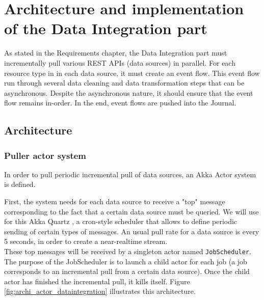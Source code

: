 \chapter{Architecture and implementation of the Data Integration part}

As stated in the Requirements chapter, the Data Integration part must incrementally pull various REST APIs (data sources) in parallel. For each resource type in
in each data source, it must create an event flow. This event flow run through several data cleaning and data transformation steps that can
be asynchronous. Despite the asynchronous nature, it should ensure that the event flow remains in-order. In the end, event flows are pushed
into the Journal.

\section{Architecture}

\subsection{Puller actor system}

In order to pull periodic incremental pull of data sources, an Akka Actor system is defined. 

First, the system needs for each data source to receive a "top" message corresponding to the fact that a certain data source must be queried. We will use for this
Akka Quartz , a cron-style scheduler that allows to define periodic sending of certain types of messages. An usual pull rate for a data source
is every 5 seconds, in order to create a near-realtime stream.
\\

These top messages will be received by a singleton actor named \verb|JobScheduler|. The purpose of the JobScheduler is to launch a child actor for each job (a job
corresponds to an incremental pull from a certain data source). Once the child actor has finished the incremental pull, it kills itself. Figure \ref{fig:archi_actor_dataintegration} illustrates this architecture.

